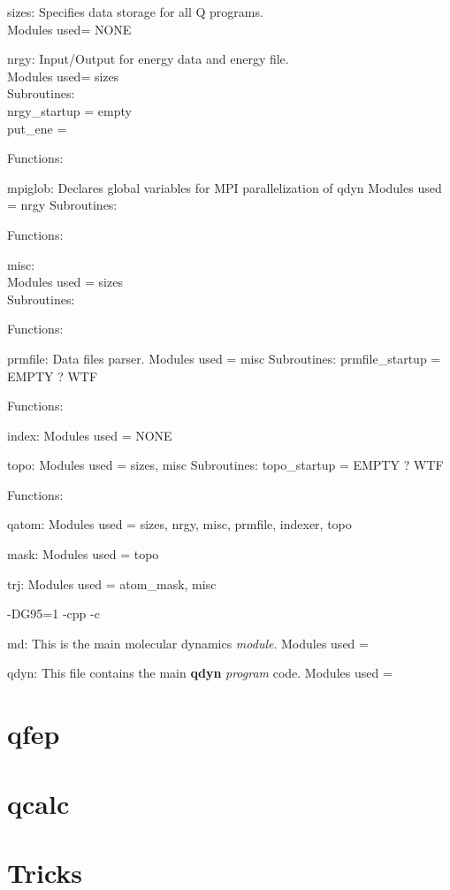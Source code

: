 \documentclass[10pt, oneside, pdftex]{article}
\begin{document}
sizes: Specifies data storage for all Q programs.\\
Modules used= NONE

nrgy: Input/Output for energy data and energy file.\\
Modules used= sizes\\
Subroutines:\\
  nrgy\_startup = empty\\
  put\_ene =

Functions:

mpiglob: Declares global variables for MPI parallelization of qdyn
Modules used = nrgy
Subroutines:

Functions:


misc:\\
Modules used = sizes\\
Subroutines:

Functions:


prmfile: Data files parser.
Modules used = misc
Subroutines:
  prmfile\_startup = EMPTY ? WTF


Functions:


index:
Modules used = NONE


topo:
Modules used = sizes, misc
Subroutines:
  topo\_startup = EMPTY ? WTF


Functions:


qatom:
Modules used = sizes, nrgy, misc, prmfile, indexer, topo


mask:
Modules used = topo


trj:
Modules used = atom\_mask, misc




-DG95=1 -cpp -c

md: This is the main molecular dynamics \textit{module}.
Modules used =


qdyn: This file contains the main \textbf{qdyn} \textit{program} code.
Modules used =



\section{qfep}
\label{qfep}


\section{qcalc}
\label{qcalc}


\section{Tricks}
\label{tricks}
\end{document}
